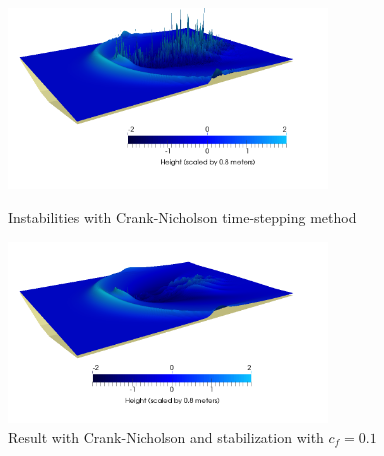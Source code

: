 \documentclass[11pt,a4paper]{article}
\begin{document}
	\begin{figure}[!h]
		\begin{minipage}[t]{0.5\linewidth}
			\centering
			\includegraphics[height=4.8cm]{Instabilities.png}
			\caption{Instabilities with Crank-Nicholson time-stepping method}
		\end{minipage}
		\hspace{10pt}
		\begin{minipage}[t]{0.5\linewidth}
			\centering
			\includegraphics[height=4.8cm]{InstabilitiesCorrection.png}
			\caption{Result with Crank-Nicholson and stabilization with $c_f = 0.1$}
		\end{minipage}
	\end{figure}
		
\end{document}

